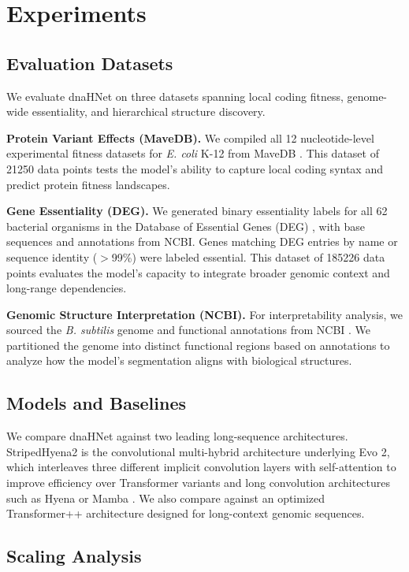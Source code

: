 \documentclass{article}
\theoremstyle{plain}
\theoremstyle{definition}
\theoremstyle{remark}
\begin{document}
\section{Experiments}

\subsection{Evaluation Datasets}
We evaluate dnaHNet on three datasets spanning local coding fitness, genome-wide essentiality, and hierarchical structure discovery.

\textbf{Protein Variant Effects (MaveDB).} We compiled all 12 nucleotide-level experimental fitness datasets for \textit{E. coli} K-12 from MaveDB \citep{Esposito2019, Rubin2025}. This dataset of 21250 data points tests the model's ability to capture local coding syntax and predict protein fitness landscapes.

\textbf{Gene Essentiality (DEG).} We generated binary essentiality labels for all 62 bacterial organisms in the Database of Essential Genes (DEG) \citep{Luo2021}, with base sequences and annotations from NCBI. Genes matching DEG entries by name or sequence identity ($>$99\%) were labeled essential. This dataset of 185226 data points evaluates the model's capacity to integrate broader genomic context and long-range dependencies.

\textbf{Genomic Structure Interpretation (NCBI).} For interpretability analysis, we sourced the \textit{B. subtilis} genome and functional annotations from NCBI \citep{NCBI2024}. We partitioned the genome into distinct functional regions based on annotations to analyze how the model's segmentation aligns with biological structures.

\subsection{Models and Baselines}
We compare dnaHNet against two leading long-sequence architectures. StripedHyena2 \citep{ku2025systemsalgorithmsconvolutionalmultihybrid} is the convolutional multi-hybrid architecture underlying Evo 2, which interleaves three different implicit convolution layers with self-attention to improve efficiency over Transformer variants and long convolution architectures such as Hyena or Mamba \cite{gu2024mambalineartimesequencemodeling}. We also compare against an optimized Transformer++ architecture \citep{Nguyen2024} designed for long-context genomic sequences.

\subsection{Scaling Analysis}
\label{scaling_analysis}
\end{document}
